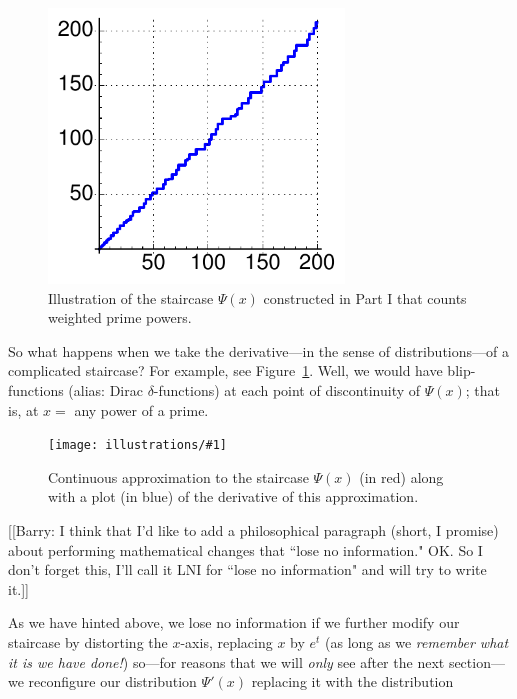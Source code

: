 \documentclass[11pt,draft]{article}
\newcommand{\ill}[3]{ 
   \begin{figure}[H]
   \begin{center}
   \texttt{[image: illustrations/\#1]}
   \caption{#3}
   \end{center}
    \end{figure}
}
\theoremstyle{plain}
\theoremstyle{definition}
\numberwithin{equation}{section}
\numberwithin{figure}{section}
\numberwithin{table}{section}
\begin{document}
\begin{figure}[H]
\begin{center}
\includegraphics[width=0.7\textwidth]{illustrations/psi_200}
\caption{Illustration of the  staircase $\Psi(x)$  constructed in Part I that 
counts weighted prime powers.\label{fig:psi_200}}
\end{center}
\end{figure}
  
So what happens when we take the derivative---in the sense of
distributions---of a complicated staircase?  For example, see
Figure~\ref{fig:psi_200}.  Well, we would have blip-functions (alias:
Dirac $\delta$-functions) at each point of discontinuity of $\Psi(x)$;
that is, at $x=$ any power of a prime.
  
     \bigskip
   
     \ill{psi_prime}{.7}{Continuous approximation to the staircase
       $\Psi(x)$ (in red) along with a plot (in blue) of the
       derivative of this approximation.}
      
\bigskip

[[Barry: I think that I'd like to add a philosophical paragraph
(short, I promise) about performing mathematical changes that ``lose
no information."  OK. So I don't forget this, I'll call it LNI for
``lose no information" and will try to write it.]]
  
As we have hinted above, we lose no information if we further modify
our staircase by distorting the $x$-axis, replacing $x$ by $e^t$ (as
long as we {\em remember what it is we have done!})  so---for reasons
that we will {\em only} see after the next section---we reconfigure
our distribution $\Psi'(x)$ replacing it with the distribution
\end{document}
